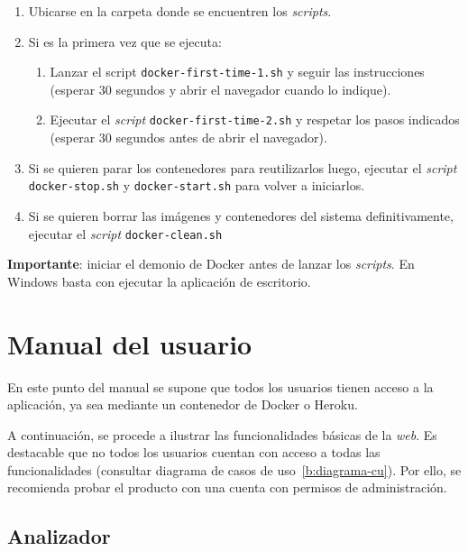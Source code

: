 \begin{enumerate}
	\item Ubicarse en la carpeta donde se encuentren los \textit{scripts}.
	\item Si es la primera vez que se ejecuta:
	\begin{enumerate}
	\item Lanzar el script \texttt{docker-first-time-1.sh} y seguir las instrucciones (esperar 30 segundos y abrir el navegador cuando lo indique).
	\item Ejecutar el \textit{script} \texttt{docker-first-time-2.sh} y respetar los pasos indicados (esperar 30 segundos antes de abrir el navegador).
	\end{enumerate}
	\item Si se quieren parar los contenedores para reutilizarlos luego, ejecutar el \textit{script} \texttt{docker-stop.sh} y \texttt{docker-start.sh} para volver a iniciarlos.
	\item Si se quieren borrar las imágenes y contenedores del sistema definitivamente, ejecutar el \textit{script} \texttt{docker-clean.sh}
\end{enumerate}

\textbf{Importante}: iniciar el demonio de Docker antes de lanzar los \textit{scripts}. En Windows basta con ejecutar la aplicación de escritorio.

\section{Manual del usuario}

En este punto del manual se supone que todos los usuarios tienen acceso a la aplicación, ya sea mediante un contenedor de Docker o Heroku.

A continuación, se procede a ilustrar las funcionalidades básicas de la \textit{web}. Es destacable que no todos los usuarios cuentan con acceso a todas las funcionalidades (consultar diagrama de casos de uso~\ref{b:diagrama-cu}). Por ello, se recomienda probar el producto con una cuenta con permisos de administración.


\subsection{Analizador}
\label{s-e:analizador}

